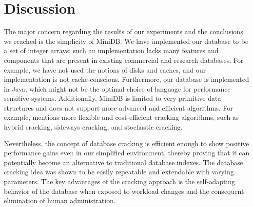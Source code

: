 \section{Discussion}
\indent The major concern regarding the results of our experiments and the conclusions we reached is the simplicity of MiniDB. We have implemented our database to be a set of integer arrays; such an implementation lacks many features and components that are present in existing commercial and research databases. For example, we have not used the notions of disks and caches, and our implementation is not cache-conscious.  Furthermore, our database is implemented in Java, which might not be the optimal choice of language for performance-sensitive systems. Additionally, MiniDB is limited to very primitive data structures and does not support more advanced and efficient algorithms. For example, \cite{schuhknecht_2014} mentions more flexible and cost-efficient cracking algorithms, such as hybrid cracking, sideways cracking, and stochastic cracking.

Nevertheless, the concept of database cracking is efficient enough to show positive performance gains even in our simplified environment, thereby proving that it can potentially become an alternative to traditional database indexes. The database cracking idea was shown to be easily repeatable and extendable with varying parameters. The key advantages of the cracking approach is the self-adapting behavior of the database when exposed to workload changes and the consequent elimination of human administration.
\label{sec:discussion}
